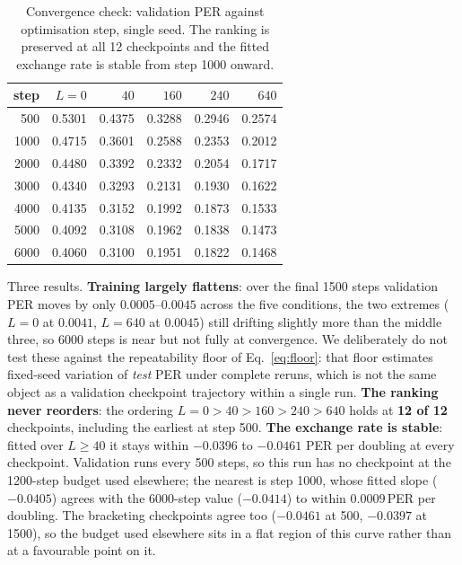 \documentclass[journal]{IEEEtran}
\begin{document}
\begin{table}[t]
\centering\footnotesize
\setlength{\tabcolsep}{4pt}
\renewcommand{\arraystretch}{0.93}
\caption{Convergence check: validation PER against optimisation step, single
seed. The ranking is preserved at all 12 checkpoints and the fitted exchange
rate is stable from step 1000 onward.}
\label{tab:conv}
\begin{tabular}{rrrrrr}
\toprule
step & $L{=}0$ & $40$ & $160$ & $240$ & $640$ \\
\midrule
500  & 0.5301 & 0.4375 & 0.3288 & 0.2946 & 0.2574 \\
1000 & 0.4715 & 0.3601 & 0.2588 & 0.2353 & 0.2012 \\
2000 & 0.4480 & 0.3392 & 0.2332 & 0.2054 & 0.1717 \\
3000 & 0.4340 & 0.3293 & 0.2131 & 0.1930 & 0.1622 \\
4000 & 0.4135 & 0.3152 & 0.1992 & 0.1873 & 0.1533 \\
5000 & 0.4092 & 0.3108 & 0.1962 & 0.1838 & 0.1473 \\
6000 & 0.4060 & 0.3100 & 0.1951 & 0.1822 & 0.1468 \\
\bottomrule
\end{tabular}
\end{table}

Three results. \textbf{Training largely flattens}: over the final 1500 steps
validation PER moves by only $0.0005$--$0.0045$ across the five conditions, the
two extremes ($L{=}0$ at $0.0041$, $L{=}640$ at $0.0045$) still drifting
slightly more than the middle three, so 6000 steps is near but not fully at
convergence. We deliberately do not test these against the repeatability floor
of Eq.~\ref{eq:floor}: that floor estimates fixed-seed variation of \emph{test}
PER under complete reruns, which is not the same object as a validation
checkpoint trajectory within a single run. \textbf{The ranking never reorders}: the ordering
$L{=}0 > 40 > 160 > 240 > 640$ holds at \textbf{12 of 12} checkpoints,
including the earliest at step 500. \textbf{The exchange rate is stable}:
fitted over $L\geq40$ it stays within $-0.0396$ to $-0.0461$ PER per doubling
at every checkpoint. Validation runs every 500 steps, so this run has no
checkpoint at the 1200-step budget used elsewhere; the nearest is step 1000,
whose fitted slope ($-0.0405$) agrees with the 6000-step value ($-0.0414$) to
within $0.0009$\,PER per doubling. The bracketing checkpoints agree
too ($-0.0461$ at 500, $-0.0397$ at 1500), so the budget used elsewhere sits in
a flat region of this curve rather than at a favourable point on it.
\end{document}
